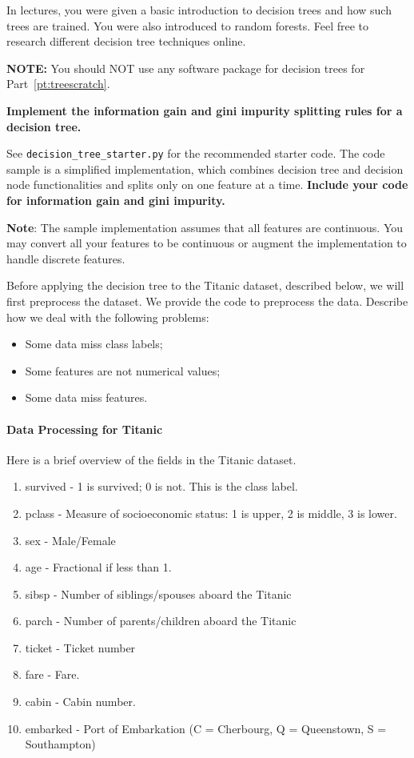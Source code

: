 \documentclass[preview]{standalone}
\begin{document}
In lectures, you were given a basic introduction to decision trees and how such trees are trained. You were also introduced to random forests. Feel free to research different decision tree techniques online.

\textbf{NOTE:} You should NOT use any software package for decision trees for Part~\ref{pt:treescratch}.

\begin{Parts}


\Part \label{pt:treescratch} \textbf{Implement the information gain and gini impurity splitting rules for a decision tree.}

See \texttt{decision\_tree\_starter.py} for the recommended starter code. The code sample is a simplified implementation, which combines decision tree and decision node functionalities and splits only on one feature at a time. \textbf{Include your code for information gain and gini impurity.}

\textbf{Note}: The sample implementation assumes that all features are continuous. You may convert all your features to be continuous or augment the implementation to handle discrete features.




\Part Before applying the decision tree to the Titanic dataset, described below, we will first preprocess the dataset. We provide the code to preprocess the data.  Describe how we deal with the following problems:
\begin{itemize}
\item Some data miss class labels;
\item Some features are not numerical values;
\item Some data miss features.
\end{itemize}

\paragraph{Data Processing for Titanic}
Here is a brief overview of the fields in the Titanic dataset.
\begin{enumerate}
	\item survived - 1 is survived; 0 is not. This is the class label.
	\item pclass - Measure of socioeconomic status: 1 is upper, 2 is middle, 3 is lower.
	\item sex - Male/Female
	\item age - Fractional if less than 1.
	\item sibsp - Number of siblings/spouses aboard the Titanic
	\item parch - Number of parents/children aboard the Titanic
	\item ticket - Ticket number
	\item fare - Fare.
	\item cabin - Cabin number.
	\item embarked - Port of Embarkation (C = Cherbourg, Q = Queenstown, S = Southampton)
\end{enumerate}




\end{Parts}
\end{document}
